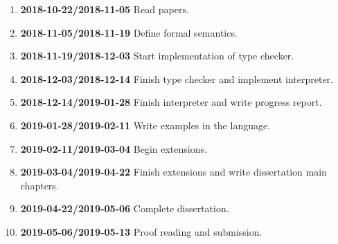 \documentclass[12pt,a4paper,twoside]{article}
\begin{document}
\begin{enumerate}

\item \textbf{2018-10-22/2018-11-05} Read papers.

\item \textbf{2018-11-05/2018-11-19} Define formal semantics.

\item \textbf{2018-11-19/2018-12-03} Start implementation of type checker.

\item \textbf{2018-12-03/2018-12-14} Finish type checker and implement interpreter.

\item \textbf{2018-12-14/2019-01-28} Finish interpreter and write progress report.

\item \textbf{2019-01-28/2019-02-11} Write examples in the language.

\item \textbf{2019-02-11/2019-03-04} Begin extensions.

\item \textbf{2019-03-04/2019-04-22} Finish extensions and write dissertation main chapters.

\item \textbf{2019-04-22/2019-05-06}  Complete dissertation.

\item \textbf{2019-05-06/2019-05-13} Proof reading and submission.

\end{enumerate}
\end{document}

